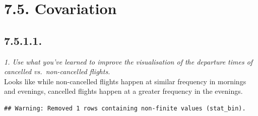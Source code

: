 \documentclass[]{book}
\newenvironment{Shaded}{\begin{snugshade}}{\end{snugshade}}
\newcommand{\DataTypeTok}[1]{\textcolor[rgb]{0.13,0.29,0.53}{#1}}
\newcommand{\DecValTok}[1]{\textcolor[rgb]{0.00,0.00,0.81}{#1}}
\newcommand{\FloatTok}[1]{\textcolor[rgb]{0.00,0.00,0.81}{#1}}
\newcommand{\KeywordTok}[1]{\textcolor[rgb]{0.13,0.29,0.53}{\textbf{#1}}}
\newcommand{\NormalTok}[1]{#1}
\newcommand{\OperatorTok}[1]{\textcolor[rgb]{0.81,0.36,0.00}{\textbf{#1}}}
\newcommand{\StringTok}[1]{\textcolor[rgb]{0.31,0.60,0.02}{#1}}
\theoremstyle{definition}
\theoremstyle{definition}
\theoremstyle{definition}
\theoremstyle{remark}
\begin{document}
\hypertarget{covariation}{%
\section{7.5. Covariation}\label{covariation}}

\hypertarget{section-23}{%
\subsection{7.5.1.1.}\label{section-23}}

\emph{1. Use what you've learned to improve the visualisation of the
departure times of cancelled vs.~non-cancelled flights.}\\
Looks like while non-cancelled flights happen at similar frequency in
mornings and evenings, cancelled flights happen at a greater frequency
in the evenings.

\begin{Shaded}
\end{Shaded}

\begin{verbatim}
## Warning: Removed 1 rows containing non-finite values (stat_bin).
\end{verbatim}
\end{document}
